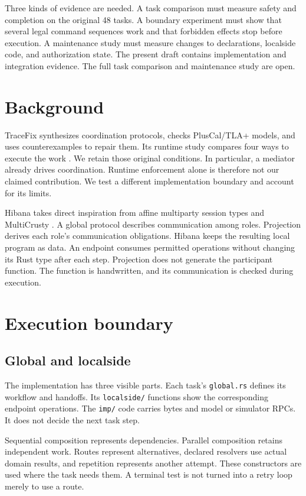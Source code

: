 \documentclass[10pt]{article}
\begin{document}
Three kinds of evidence are needed. A task comparison must measure safety and
completion on the original 48 tasks. A boundary experiment must show that
several legal command sequences work and that forbidden effects stop before
execution. A maintenance study must measure changes to declarations, localside
code, and authorization state. The present draft contains implementation and
integration evidence. The full task comparison and maintenance study are open.

\section{Background}
TraceFix synthesizes coordination protocols, checks PlusCal/TLA+ models, and
uses counterexamples to repair them. Its runtime study compares four ways to
execute the work \cite{tracefix}. We retain those original conditions. In
particular, a mediator already drives coordination. Runtime enforcement alone
is therefore not our claimed contribution. We test a different implementation
boundary and account for its limits.

Hibana takes direct inspiration from affine multiparty session types and
MultiCrusty \cite{ampst}. A global protocol describes communication among
roles. Projection derives each role's communication obligations. Hibana keeps
the resulting local program as data. An endpoint consumes permitted operations
without changing its Rust type after each step. Projection does not generate
the participant function. The function is handwritten, and its communication
is checked during execution.

\section{Execution boundary}
\subsection{Global and localside}
The implementation has three visible parts. Each task's \texttt{global.rs}
defines its workflow and handoffs. Its \texttt{localside/} functions show the
corresponding endpoint operations. The \texttt{imp/} code carries bytes and
model or simulator RPCs. It does not decide the next task step.

Sequential composition represents dependencies. Parallel composition retains
independent work. Routes represent alternatives, declared resolvers use actual
domain results, and repetition represents another attempt. These constructors
are used where the task needs them. A terminal test is not turned into a retry
loop merely to use a route.
\end{document}
